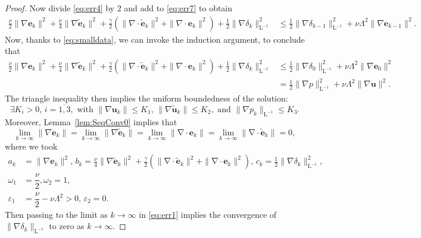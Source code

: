 \documentclass[3p]{elsarticle}
\def\V#1{\mathbf{#1}}
\def\Vt#1{\mathbf{\tilde{#1}}}
\newcommand{\divergence}{\mathrm{\nabla \cdot}}
\newcommand{\Linvmap}{\mathrm{L^{-1}}}
\begin{document}
\begin{proof}
Now divide \eqref{eq:err4} by $2$ and add to \eqref{eq:err7} to obtain
\begin{equation}\label{eq:err8}   
\begin{aligned}
\frac{\nu}{2} \|\nabla \V{e}_{k} \|^2 +  \frac{\nu}{4} \|\nabla \V{\tilde{e}}_{k} \|^2 
+ \frac{\gamma}{2}\left( \| \nabla \cdot \V{\tilde{e}}_{k} \|^2 + \| \nabla \cdot \V{e}_{k} \|^2 \right)
+ \frac{1}{2} \|\nabla \delta_{k} \|^2_{\Linvmap}
& \le \frac{1}{2} \|\nabla \delta_{k-1} \|^2_{\Linvmap} + \nu \Lambda^2 \|\nabla \V{e}_{k-1} \|^2.
\end{aligned}
\end{equation}
Now, thanks to \eqref{eq:smalldata}, we can invoke the induction argument, to conclude that
\begin{equation}\label{eq:err9}   
\begin{aligned}
\frac{\nu}{2} \|\nabla \V{e}_{k} \|^2 +  \frac{\nu}{4} \|\nabla \V{\tilde{e}}_{k} \|^2 
+ \frac{\gamma}{2}\left( \| \nabla \cdot \V{\tilde{e}}_{k} \|^2 + \| \nabla \cdot \V{e}_{k} \|^2 \right)
+ \frac{1}{2} \|\nabla \delta_{k} \|^2_{\Linvmap}
& \le \frac{1}{2} \|\nabla \delta_{0} \|^2_{\Linvmap} + \nu \Lambda^2 \|\nabla \V{e}_{0} \|^2 \\
& = \frac{1}{2} \|\nabla p \|^2_{\Linvmap} + \nu \Lambda^2 \|\nabla \V{u} \|^2.
\end{aligned}
\end{equation}
The triangle inequality then implies the uniform boundedness of the solution:
\begin{equation}
\label{eq:err9}
\exists K_i>0, \, i=\overline{1,3}, \text{ with } \|\nabla \V{u}_k\| \leq K_1, \, \|\nabla \Vt{u}_k\| \leq K_2, \text{ and } \| \nabla p_k \|_{\Linvmap} \le K_3.     
\end{equation}
Moreover, Lemma~\ref{lem:SeqConv0} implies that 
\begin{equation}
    \label{eq:err9.5}
    \lim \limits_{k \rightarrow \infty} \|\nabla \V{e}_{k} \| = \lim \limits_{k \rightarrow \infty} \|\nabla \Vt{e}_{k} \|= \lim \limits_{k \rightarrow \infty} \|\divergence \V{e}_{k} \| = \lim \limits_{k \rightarrow \infty} \|\divergence \Vt{e}_{k} \| = 0,
\end{equation}
where we took
\begin{equation} \label{eq:err10}  
\begin{aligned}
a_k & = \|\nabla \V{e}_{k} \|^2, \, b_k = \frac{\nu}{4}\|\nabla \Vt{e}_{k} \|^2 + \frac{\gamma}{2} \left( \|\divergence \Vt{e}_{k} \|^2 + \|\divergence \V{e}_{k} \|^2 \right), \, c_k = \frac{1}{2}\|\nabla \delta_{k} \|^2_{\Linvmap}, \\
\omega_1 & = \dfrac{\nu}{2},  \omega_2=1, \\
\varepsilon_1 & = \dfrac{\nu}{2} - \nu \Lambda^2>0, \, \varepsilon_2 = 0.
\end{aligned}
\end{equation}
Then passing to the limit as $k \rightarrow \infty$ in \eqref{eq:err1} implies the convergence of $\|\nabla \delta_k\|_{\Linvmap}$ to zero as $k \rightarrow \infty$. 
\end{proof}
\end{document}

